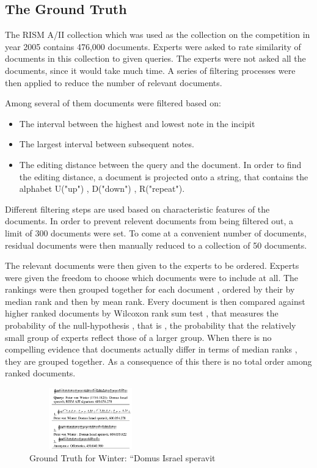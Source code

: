 \documentclass{llncs}
\begin{document}
		\subsection{The Ground Truth}
 		The RISM A/II collection which was used as the collection on the competition in year 2005 contains 476,000 documents. Experts were asked to rate similarity of documents in this collection to given queries. The experts were not asked all the documents, since it would take much time. A series of filtering processes were then applied to reduce the number of relevant documents. 

 		Among several of them documents were filtered based on: 

 		\begin{itemize}
 			\item The interval between the highest and lowest note in the incipit
 			\item The largest interval between subsequent notes.
 			\item The editing distance between the query and the document. In order to find the editing distance, a document is projected onto a string, that contains the alphabet U("up") , D("down") , R("repeat"). 
 		\end{itemize} 

 		Different filtering steps are used based on characteristic features of the documents. In order to prevent relevent documents from being filtered out, a limit of 300 documents were set. To come at a convenient number of documents, residual documents were then manually reduced to a collection of 50 documents.

 		The relevant documents were then given to the experts to be ordered. Experts were given the freedom to choose which documents were to include at all. The rankings were then grouped together for each document , ordered by their by median rank and then by mean rank. Every document is then compared against higher ranked documents by Wilcoxon rank sum test , that measures the probability of the null-hypothesis , that is , the probability that the relatively small group of experts reflect those of a larger group. When there is no compelling evidence that documents actually differ in terms of median ranks , they are grouped together. As a consequence of this there is no total order among ranked documents. 

 		\begin{figure}[h!]
			\centering
			\includegraphics[width=200px,height=100px,keepaspectratio]{one_of_two_point_four_point_four}
			\caption{Ground Truth for Winter: “Domus Israel speravit \cite{two_point_four_point_four}}
		\end{figure}
\end{document}

